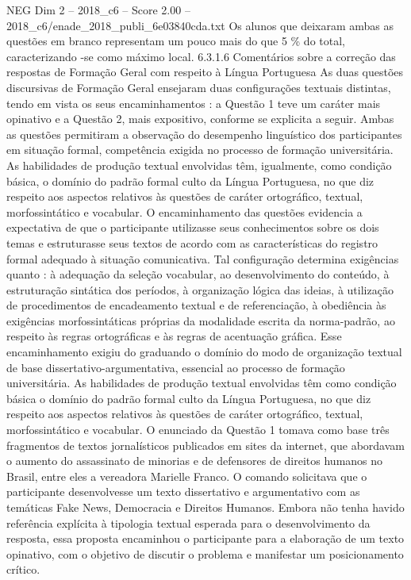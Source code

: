 \begin{textsample}{NEG Dim 2 – 2018\_c6 – Score 2.00 – 2018\_c6/enade\_2018\_publi\_6e03840cda.txt}
Os alunos que deixaram ambas as questões em branco representam um pouco mais do que 5 \% do total, caracterizando -se como máximo local. 6.3.1.6 Comentários sobre a correção das respostas de Formação Geral com respeito à Língua Portuguesa As duas questões discursivas de Formação Geral ensejaram duas configurações textuais distintas, tendo em vista os seus encaminhamentos : a Questão 1 teve um caráter mais opinativo e a Questão 2, mais expositivo, conforme se explicita a seguir.
Ambas as questões permitiram a observação do desempenho linguístico dos participantes em situação formal, competência exigida no processo de formação universitária.
As habilidades de produção textual envolvidas têm, igualmente, como condição básica, o domínio do padrão formal culto da Língua Portuguesa, no que diz respeito aos aspectos relativos às questões de caráter ortográfico, textual, morfossintático e vocabular.
O encaminhamento das questões evidencia a expectativa de que o participante utilizasse seus conhecimentos sobre os dois temas e estruturasse seus textos de acordo com as características do registro formal adequado à situação comunicativa.
Tal configuração determina exigências quanto : à adequação da seleção vocabular, ao desenvolvimento do conteúdo, à estruturação sintática dos períodos, à organização lógica das ideias, à utilização de procedimentos de encadeamento textual e de referenciação, à obediência às exigências morfossintáticas próprias da modalidade escrita da norma-padrão, ao respeito às regras ortográficas e às regras de acentuação gráfica.
Esse encaminhamento exigiu do graduando o domínio do modo de organização textual de base dissertativo-argumentativa, essencial ao processo de formação universitária.
As habilidades de produção textual envolvidas têm como condição básica o domínio do padrão formal culto da Língua Portuguesa, no que diz respeito aos aspectos relativos às questões de caráter ortográfico, textual, morfossintático e vocabular.
O enunciado da Questão 1 tomava como base três fragmentos de textos jornalísticos publicados em sites da internet, que abordavam o aumento do assassinato de minorias e de defensores de direitos humanos no Brasil, entre eles a vereadora Marielle Franco.
O comando solicitava que o participante desenvolvesse um texto dissertativo e argumentativo com as temáticas Fake News, Democracia e Direitos Humanos.
Embora não tenha havido referência explícita à tipologia textual esperada para o desenvolvimento da resposta, essa proposta encaminhou o participante para a elaboração de um texto opinativo, com o objetivo de discutir o problema e manifestar um posicionamento crítico.

\end{textsample}
